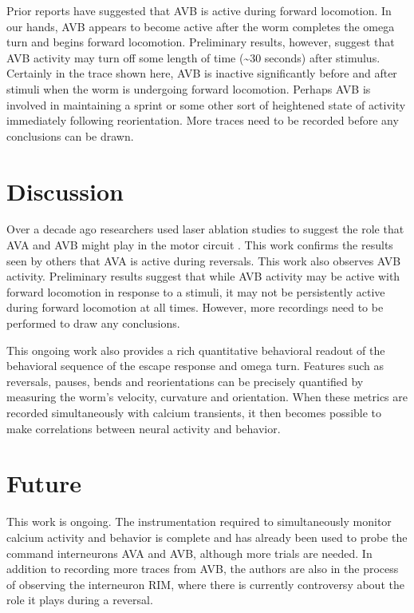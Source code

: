 Prior reports \citep{zheng_neuronal_1999, kawano_imbalancing_2011}
 have suggested that AVB is active during forward locomotion. In our hands, AVB appears to become active after the worm completes the omega turn and begins forward locomotion. Preliminary results, however, suggest that AVB activity may turn off some length of time (\textasciitilde 30 seconds) after stimulus. Certainly in the trace shown here, AVB is inactive significantly before and after stimuli when the worm is undergoing forward locomotion. Perhaps AVB is involved in maintaining a sprint or some other sort of heightened state of activity immediately following reorientation.    More traces need to be recorded before any conclusions can be drawn.


\section{Discussion}	
Over a decade ago researchers used laser ablation studies to suggest the role that AVA and AVB might play in the motor circuit \citep{zheng_neuronal_1999}. This work confirms the results seen by others \citep{faumont_image-free_2011, ben_arous_automated_2010, piggott_neural_2011, kawano_imbalancing_2011} that AVA is active during reversals. This work also observes AVB activity. Preliminary results suggest that while AVB activity may be active with forward locomotion in response to a stimuli, it may not be persistently active during forward locomotion at all times. However, more recordings need to be performed to draw any conclusions. 

This ongoing work also provides a rich quantitative behavioral readout of the behavioral sequence of the escape response and omega turn. Features such as reversals, pauses, bends and reorientations can be precisely quantified by measuring the worm's velocity, curvature and orientation. When these metrics are recorded simultaneously with calcium transients, it then becomes possible to make correlations between neural activity and behavior. 

\section{Future}
This work is ongoing.  The instrumentation required to simultaneously monitor calcium activity and behavior is complete and has already been used to probe the command interneurons AVA and AVB, although more trials are needed. In addition to recording more traces from AVB, the authors are also in the process of observing the interneuron RIM, where there is currently controversy about the role it plays during a reversal.  

